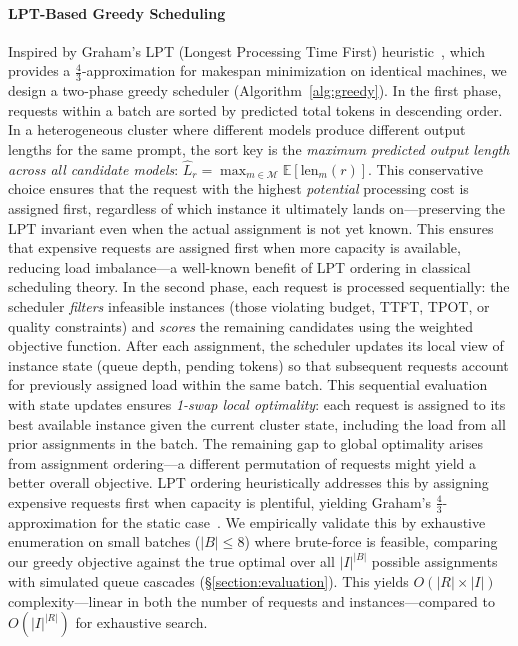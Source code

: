\documentclass[letterpaper, anonymous, twocolumn, 10pt]{article}
\begin{document}
\paragraph{LPT-Based Greedy Scheduling}
Inspired by Graham's LPT (Longest Processing Time First) heuristic~\cite{graham1969bounds}, which provides a $\frac{4}{3}$-approximation for makespan minimization on identical machines, we design a two-phase greedy scheduler (Algorithm~\ref{alg:greedy}).
In the first phase, requests within a batch are sorted by predicted total tokens in descending order.
In a heterogeneous cluster where different models produce different output lengths for the same prompt, the sort key is the \emph{maximum predicted output length across all candidate models}: $\hat{L}_r = \max_{m \in \mathcal{M}} \mathbb{E}[\text{len}_m(r)]$.
This conservative choice ensures that the request with the highest \emph{potential} processing cost is assigned first, regardless of which instance it ultimately lands on---preserving the LPT invariant even when the actual assignment is not yet known.
This ensures that expensive requests are assigned first when more capacity is available, reducing load imbalance---a well-known benefit of LPT ordering in classical scheduling theory.
In the second phase, each request is processed sequentially: the scheduler \emph{filters} infeasible instances (those violating budget, TTFT, TPOT, or quality constraints) and \emph{scores} the remaining candidates using the weighted objective function.
After each assignment, the scheduler updates its local view of instance state (queue depth, pending tokens) so that subsequent requests account for previously assigned load within the same batch.
This sequential evaluation with state updates ensures \emph{1-swap local optimality}: each request is assigned to its best available instance given the current cluster state, including the load from all prior assignments in the batch.
The remaining gap to global optimality arises from assignment ordering---a different permutation of requests might yield a better overall objective.
LPT ordering heuristically addresses this by assigning expensive requests first when capacity is plentiful, yielding Graham's $\frac{4}{3}$-approximation for the static case~\cite{graham1969bounds}.
We empirically validate this by exhaustive enumeration on small batches ($|B| \leq 8$) where brute-force is feasible, comparing our greedy objective against the true optimal over all $|I|^{|B|}$ possible assignments with simulated queue cascades (\S\ref{section:evaluation}).
This yields $O(|R| \times |I|)$ complexity---linear in both the number of requests and instances---compared to $O(|I|^{|R|})$ for exhaustive search.
\end{document}
